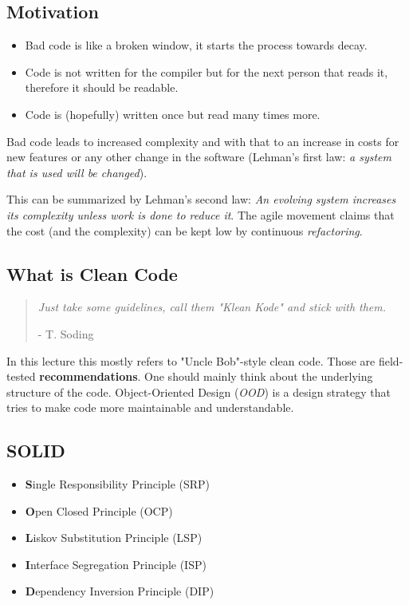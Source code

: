 
\subsection{Motivation}

\begin{itemize}
  \item Bad code is like a broken window, it starts the process towards decay.
  \item Code is not written for the compiler but for the next person that reads it, therefore it
    should be readable.
  \item Code is (hopefully) written once but read many times more.
\end{itemize}

Bad code leads to increased complexity and with that to an increase in costs for new features or any
other change in the software (Lehman's first law: \textit{a system that is used will be changed}). 
%

%
This can be summarized by Lehman's second law: \textit{An evolving system increases its complexity
unless work is done to reduce it}.
%
The agile movement claims that the cost (and the complexity) can be kept low by continuous
\emph{refactoring}.

\subsection{What is Clean Code}

\begin{quote}
  \textit{Just take some guidelines, call them "Klean Kode" and stick with them.}
 
  - T. Soding
\end{quote}
%

%
In this lecture this mostly refers to "Uncle Bob"-style clean code. Those are field-tested
\textbf{recommendations}.
%
One should mainly think about the underlying structure of the code. 
%
Object-Oriented Design (\textit{OOD}) is a design strategy that tries to make code more maintainable
and understandable.

\subsection{SOLID}

\begin{itemize}
  \item \textbf{S}ingle Responsibility Principle (SRP)
  \item \textbf{O}pen Closed Principle (OCP)
  \item \textbf{L}iskov Substitution Principle (LSP)
  \item \textbf{I}nterface Segregation Principle (ISP)
  \item \textbf{D}ependency Inversion Principle (DIP)
\end{itemize}

